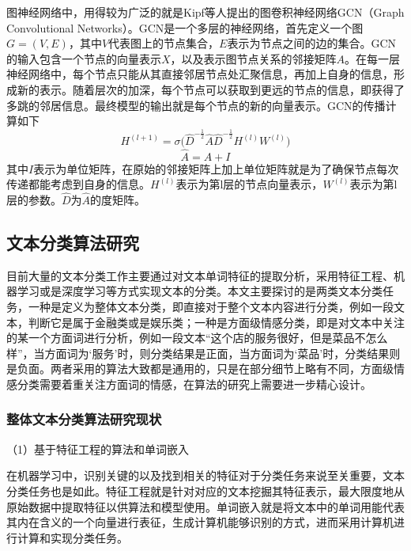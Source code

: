 图神经网络中，用得较为广泛的就是Kipf等人提出的图卷积神经网络GCN（Graph Convolutional Networks）。GCN是一个多层的神经网络，首先定义一个图$G=\left(V,E\right)$，其中$V$代表图上的节点集合，$E$表示为节点之间的边的集合。GCN的输入包含一个节点的向量表示$X$，以及表示图节点关系的邻接矩阵$A$。在每一层神经网络中，每个节点只能从其直接邻居节点处汇聚信息，再加上自身的信息，形成新的表示。随着层次的加深，每个节点可以获取到更远的节点的信息，即获得了多跳的邻居信息。最终模型的输出就是每个节点的新的向量表示。GCN的传播计算如下
\begin{equation}\label{gcnFormula1}
    H^{\left(l+1\right)}=\sigma{{(\hat{D}}^{-\frac{1}{2}}\hat{A}\hat{D}^{-\frac{1}{2}}}H^{\left(l\right)}W^{\left(l\right)})
\end{equation}
\begin{equation}\label{gcnFormula2}
\hat{A}=A+I
\end{equation}
    其中$I$表示为单位矩阵，在原始的邻接矩阵上加上单位矩阵就是为了确保节点每次传递都能考虑到自身的信息。$H^{\left(l\right)}$表示为第l层的节点向量表示，$W^{\left(l\right)}$表示为第l层的参数。$\hat{D}$为$\hat{A}$的度矩阵。

\subsection{文本分类算法研究}
目前大量的文本分类工作主要通过对文本单词特征的提取分析，采用特征工程、机器学习或是深度学习等方式实现文本的分类。本文主要探讨的是两类文本分类任务，一种是定义为整体文本分类，即直接对于整个文本内容进行分类，例如一段文本，判断它是属于金融类或是娱乐类；一种是方面级情感分类，即是对文本中关注的某一个方面词进行分析，例如一段文本“这个店的服务很好，但是菜品不怎么样”，当方面词为‘服务’时，则分类结果是正面，当方面词为‘菜品’时，分类结果则是负面。两者采用的算法大致都是通用的，只是在部分细节上略有不同，方面级情感分类需要着重关注方面词的情感，在算法的研究上需要进一步精心设计。

\subsubsection{整体文本分类算法研究现状}
（1）基于特征工程的算法和单词嵌入

在机器学习中，识别关键的以及找到相关的特征对于分类任务来说至关重要，文本分类任务也是如此。特征工程就是针对对应的文本挖掘其特征表示，最大限度地从原始数据中提取特征以供算法和模型使用。单词嵌入就是将文本中的单词用能代表其内在含义的一个向量进行表征，生成计算机能够识别的方式，进而采用计算机进行计算和实现分类任务。

